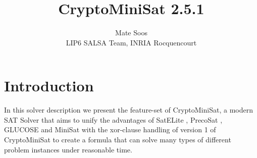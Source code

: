 \documentclass[final]{ieee}
\begin{document}

\title{CryptoMiniSat 2.5.1}
\author{Mate Soos\\LIP6 SALSA Team, INRIA Rocquencourt}

\maketitle
\thispagestyle{empty}
\pagestyle{empty}


\section{Introduction}

In this solver description we present the feature-set of CryptoMiniSat, a modern SAT Solver that aims to unify the advantages of SatELite \cite{DBLP:conf/sat/EenB05}, PrecoSat \cite{precosat}, GLUCOSE \cite{glucose} and MiniSat \cite{EenS03MiniSat} with the xor-clause handling of version 1 of CryptoMiniSat \cite{DBLP:conf/sat/SoosNC09} to create a formula that can solve many types of different problem instances under reasonable time.

\end{document}
